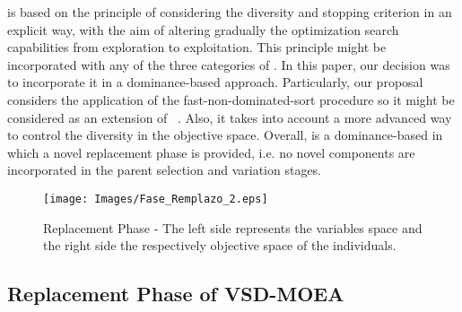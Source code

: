 \VSDMOEA{} is based on the principle of considering the diversity and stopping criterion in an explicit way, with the aim of altering gradually the optimization
search capabilities from exploration to exploitation.
%
This principle might be incorporated with any of the three categories of \MOEAS{}.
%
In this paper, our decision was to incorporate it in a dominance-based approach.
%
Particularly, our proposal considers the application of the fast-non-dominated-sort procedure so it might be considered as an extension
of \NSGAII{}~\cite{Joel:NSGAII}.
%
Also, it takes into account a more advanced way to control the diversity in the objective space.
%
%
%
Overall, \VSDMOEA{} is a dominance-based \MOEA{} in which a novel replacement phase is provided,
i.e. no novel components are incorporated in the parent selection and variation stages.

\begin{figure}[t]
\centering
\texttt{[image: Images/Fase\_Remplazo\_2.eps]}
\caption{Replacement Phase - The left side represents the variables space and the right side the respectively objective space of the individuals.  }
\label{fig:Hypersphere}
\end{figure}


\subsection{Replacement Phase of VSD-MOEA}


